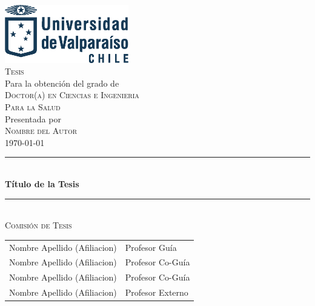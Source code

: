 
\begin{titlepage}
    \rmfamily\large %
    \centering 
    \includegraphics[width=5.4cm,keepaspectratio]{elements/logos/logoUVazul.eps}\\
    \vspace{2\baselineskip}
    \textsc{Tesis} \\ [2ex]
    Para la obtención del grado de \\ [2ex]
    \textsc{Doctor(a) en Ciencias e Ingenieria \\ Para la Salud} \\ [2ex]
    Presentada por \\ [1ex]
    \textsc{Nombre del Autor} \\ [2ex]
    \today \\
    \vspace{1\baselineskip}
    \rule{0.35\textwidth}{0.5pt} \\
    \vspace{1\baselineskip}
    {%
    \rmfamily\Large\bfseries %
    Título de la Tesis
    }\\
    \vspace{1\baselineskip}
    \rule{0.35\textwidth}{0.5pt}
    \vspace{3\baselineskip} \\
    \textsc{Comisión de Tesis} \\ [2ex] 
    \begin{tabular}{l@{\hskip 2cm}l}
        Nombre Apellido (Afiliacion) & Profesor Guía \\[10pt]
        Nombre Apellido (Afiliacion) & Profesor Co-Guía \\ [10pt]
        Nombre Apellido (Afiliacion) & Profesor Co-Guía \\ [10pt]
        Nombre Apellido (Afiliacion) & Profesor Externo \\ [10pt]
    \end{tabular}
    \vfill
\end{titlepage}